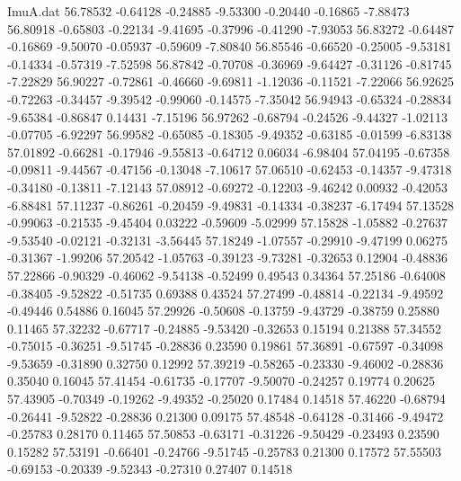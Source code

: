 \begin{filecontents}{ImuA.dat}
  56.78532   -0.64128   -0.24885   -9.53300   -0.20440   -0.16865   -7.88473
  56.80918   -0.65803   -0.22134   -9.41695   -0.37996   -0.41290   -7.93053
  56.83272   -0.64487   -0.16869   -9.50070   -0.05937   -0.59609   -7.80840
  56.85546   -0.66520   -0.25005   -9.53181   -0.14334   -0.57319   -7.52598
  56.87842   -0.70708   -0.36969   -9.64427   -0.31126   -0.81745   -7.22829
  56.90227   -0.72861   -0.46660   -9.69811   -1.12036   -0.11521   -7.22066
  56.92625   -0.72263   -0.34457   -9.39542   -0.99060   -0.14575   -7.35042
  56.94943   -0.65324   -0.28834   -9.65384   -0.86847    0.14431   -7.15196
  56.97262   -0.68794   -0.24526   -9.44327   -1.02113   -0.07705   -6.92297
  56.99582   -0.65085   -0.18305   -9.49352   -0.63185   -0.01599   -6.83138
  57.01892   -0.66281   -0.17946   -9.55813   -0.64712    0.06034   -6.98404
  57.04195   -0.67358   -0.09811   -9.44567   -0.47156   -0.13048   -7.10617
  57.06510   -0.62453   -0.14357   -9.47318   -0.34180   -0.13811   -7.12143
  57.08912   -0.69272   -0.12203   -9.46242    0.00932   -0.42053   -6.88481
  57.11237   -0.86261   -0.20459   -9.49831   -0.14334   -0.38237   -6.17494
  57.13528   -0.99063   -0.21535   -9.45404    0.03222   -0.59609   -5.02999
  57.15828   -1.05882   -0.27637   -9.53540   -0.02121   -0.32131   -3.56445
  57.18249   -1.07557   -0.29910   -9.47199    0.06275   -0.31367   -1.99206
  57.20542   -1.05763   -0.39123   -9.73281   -0.32653    0.12904   -0.48836
  57.22866   -0.90329   -0.46062   -9.54138   -0.52499    0.49543    0.34364
  57.25186   -0.64008   -0.38405   -9.52822   -0.51735    0.69388    0.43524
  57.27499   -0.48814   -0.22134   -9.49592   -0.49446    0.54886    0.16045
  57.29926   -0.50608   -0.13759   -9.43729   -0.38759    0.25880    0.11465
  57.32232   -0.67717   -0.24885   -9.53420   -0.32653    0.15194    0.21388
  57.34552   -0.75015   -0.36251   -9.51745   -0.28836    0.23590    0.19861
  57.36891   -0.67597   -0.34098   -9.53659   -0.31890    0.32750    0.12992
  57.39219   -0.58265   -0.23330   -9.46002   -0.28836    0.35040    0.16045
  57.41454   -0.61735   -0.17707   -9.50070   -0.24257    0.19774    0.20625
  57.43905   -0.70349   -0.19262   -9.49352   -0.25020    0.17484    0.14518
  57.46220   -0.68794   -0.26441   -9.52822   -0.28836    0.21300    0.09175
  57.48548   -0.64128   -0.31466   -9.49472   -0.25783    0.28170    0.11465
  57.50853   -0.63171   -0.31226   -9.50429   -0.23493    0.23590    0.15282
  57.53191   -0.66401   -0.24766   -9.51745   -0.25783    0.21300    0.17572
  57.55503   -0.69153   -0.20339   -9.52343   -0.27310    0.27407    0.14518

\end{filecontents}
